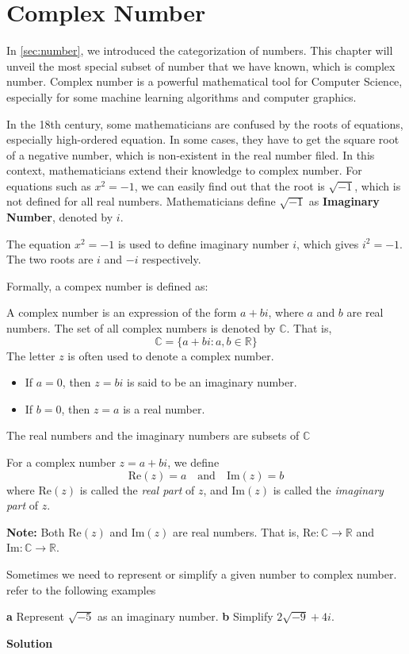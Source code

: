 \chapterspaceabove{6.75cm} 
\chapterspacebelow{7.25cm} 
\chapter{Complex Number}
In \autoref{sec:number}, we introduced the categorization of numbers. This chapter will unveil the
most special subset of number that we have known, which is complex number. Complex number is a powerful
mathematical tool for Computer Science, especially for some machine learning algorithms and computer graphics.

In the 18th century, some mathematicians are confused by the roots of equations, especially  high-ordered equation.
In some cases, they have to get the square root of a negative number, which is non-existent in the real number filed.
In this context, mathematicians extend their knowledge to complex number. For equations such as $x^2 = -1$,
we can easily find out that the root is $\sqrt{-1}$, which is not defined for all real numbers. Mathematicians
define $\sqrt{-1}$ as \textbf{Imaginary Number}, denoted by $i$.
\begin{definition}
    The equation $x^2 = -1$ is used to define imaginary number $i$, which gives $i^2 = -1$. The two roots are $i$
    and $-i$ respectively.
\end{definition}

Formally, a compex number is defined as:
\begin{definition}
    A complex number is an expression of the form \(a + bi\), where \(a\) and \(b\) are real numbers.
The set of all complex numbers is denoted by \(\mathbb{C}\). That is,
\[
\mathbb{C} = \{ a + bi : a, b \in \mathbb{R} \}
\]
The letter \(z\) is often used to denote a complex number.
\begin{itemize}
    \item If \( a = 0 \), then \( z = bi \) is said to be an imaginary number.
    \item If \( b = 0 \), then \( z = a \) is a real number.
\end{itemize}
The real numbers and the imaginary numbers are subsets of \( \mathbb{C} \)
\end{definition}

\begin{definition} 
    For a complex number \( z = a + bi \), we define
\[
\text{Re}(z) = a \quad \text{and} \quad \text{Im}(z) = b
\]
where \(\text{Re}(z)\) is called the \textit{real part} of \(z\), and \(\text{Im}(z)\) is called the \textit{imaginary part} of \(z\).

\textbf{Note:} Both \(\text{Re}(z)\) and \(\text{Im}(z)\) are real numbers. That is, \(\text{Re}: \mathbb{C} \rightarrow \mathbb{R}\) and \(\text{Im}: \mathbb{C} \rightarrow \mathbb{R}\).
\end{definition}    
Sometimes we need to represent or simplify a given number to complex number. refer to the following examples
\begin{example}
    \textbf{a} Represent \(\sqrt{-5}\) as an imaginary number. \quad
    \textbf{b} Simplify \(2\sqrt{-9} + 4i\).
\end{example}
\textbf{Solution}


